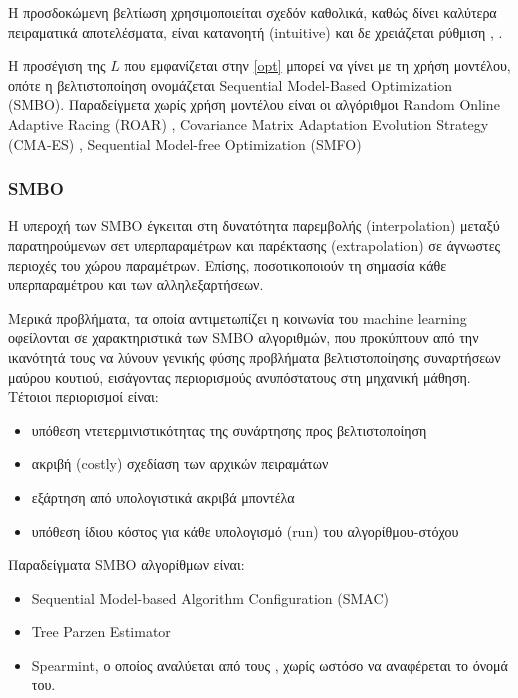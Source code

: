 \documentclass[]{article}
\numberwithin{equation}{section}		%
\numberwithin{figure}{section}			%
\numberwithin{table}{section}				%
\begin{document}
	Η προσδοκώμενη βελτίωση χρησιμοποιείται σχεδόν καθολικά, καθώς δίνει καλύτερα πειραματικά αποτελέσματα, είναι κατανοητή (intuitive) και δε χρειάζεται ρύθμιση \citep{practical},  \citep{Bergstra:2011:AHO:2986459.2986743}.
	
	
	Η προσέγιση της $L$ που εμφανίζεται στην \ref{opt} μπορεί να γίνει με τη χρήση μοντέλου, οπότε η βελτιστοποίηση ονομάζεται Sequential Model-Based Optimization (SMBO). Παραδείγμετα χωρίς χρήση μοντέλου είναι οι αλγόριθμοι Random Online Adaptive Racing (ROAR) \citep{Hutter2011}, Covari\-ance Matrix Adaptation Evolution Strategy (CMA-ES) \citep{DBLP:journals/corr/LoshchilovH16}, Sequential Model-free Optimization (SMFO) \citep{7373431}
	
	\subsubsection{SMBO} 

	Η υπεροχή των SMBO έγκειται στη δυνατότητα παρεμβολής (interpolation) μεταξύ παρατηρούμενων σετ υπερπαραμέτρων και παρέκτασης (extrapolation) σε άγνωστες περιοχές του χώρου παραμέτρων. Επίσης, ποσοτικοποιούν τη σημασία κάθε υπερπαραμέτρου και των αλληλεξαρτήσεων. 
	
	Μερικά προβλήματα, τα οποία αντιμετωπίζει η κοινωνία του machine learning οφείλονται σε  χαρακτηριστικά των SMBO αλγοριθμών, που προκύπτουν από την ικανότητά τους να λύνουν γενικής φύσης προβλήματα βελτιστοποίησης συναρτήσεων μαύρου κουτιού, εισάγοντας περιορισμούς ανυπόστατους στη μηχανική μάθηση. Τέτοιοι περιορισμοί είναι:
	\begin{itemize}
		\item υπόθεση ντετερμινιστικότητας της συνάρτησης προς βελτιστοποίηση
		\item ακριβή (costly) σχεδίαση των αρχικών πειραμάτων
		\item εξάρτηση από υπολογιστικά ακριβά μποντέλα
		\item υπόθεση ίδιου κόστος για κάθε υπολογισμό (run) του αλγορίθμου-στόχου  
	\end{itemize}
	
	Παραδείγματα SMBO αλγορίθμων είναι:
	\begin{itemize}
		\item Sequential Model-based Algorithm Configuration (SMAC) \citep{Hutter2011}
		\item Tree Parzen Estimator \citep{Bergstra:2011:AHO:2986459.2986743}
		\item Spearmint, ο οποίος αναλύεται από τους \citep{practical}, χωρίς ωστόσο να αναφέρεται το όνομά του.
	\end{itemize}
	
\end{document}
